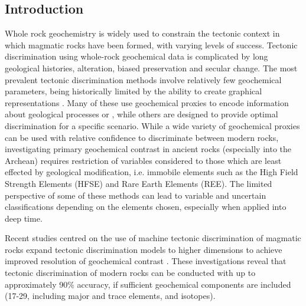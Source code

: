 \documentclass[a4,10pt]{article}
\begin{document}
	\begin{multicols*}{2}[]
	
	\subsection*{Introduction}
	
	Whole rock geochemistry is widely used to constrain the tectonic context in which magmatic rocks have been formed, with varying levels of success. Tectonic discrimination using whole-rock geochemical data is complicated by long geological histories, alteration, biased preservation and secular change. The most prevalent tectonic discrimination methods involve relatively few geochemical parameters, being historically limited by the ability to create graphical representations \citep[i.e. bivariate or ternary discrimination diagrams;][]{Pearce1973}. Many of these use geochemical proxies to encode information about geological processes or \citep[e.g. the "Pearce diagrams" which use Th/Yb, Nb/Yb and TiO\textsubscript{2}/Yb as proxies for subduction influence, source enrichment and depth of mantle melting respectively;][]{Pearce2008}, while others are designed to provide optimal discrimination for a specific scenario. While a wide variety of geochemical proxies can be used with relative confidence to discriminate between modern rocks, investigating primary geochemical contrast in ancient rocks (especially into the Archean) requires restriction of variables considered to those which are least effected by geological modification, i.e. immobile elements such as the High Field Strength Elements (HFSE) and Rare Earth Elements (REE). The limited perspective of some of these methods can lead to variable and uncertain classifications depending on the elements chosen, especially when applied into deep time. 
	
	Recent studies centred on the use of machine tectonic discrimination of magmatic rocks expand tectonic discrimination models to higher dimensions to achieve improved resolution of geochemical contrast \citep[using support vector machines, random forests and sparse multinomial regression;][]{Petrelli2016,Ueki2018}. These investigations reveal that tectonic discrimination of modern rocks can be conducted with up to approximately 90\% accuracy, if sufficient geochemical components are included (17-29, including major and trace elements, and isotopes).
	

\end{multicols*}
\end{document}
